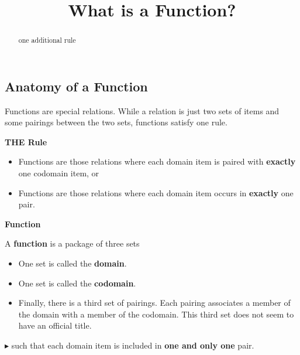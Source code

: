 \documentclass{ximera}
\title{What is a Function?}
\begin{document}
\begin{abstract}
one additional rule
\end{abstract}
\maketitle




\subsection*{Anatomy of a Function}

Functions are special relations. While a relation is just two sets of items and some pairings between the two sets, functions satisfy one rule. 


\begin{condition} \textbf{\textcolor{green!50!black}{THE Rule}} 

\begin{itemize}
\item Functions are those relations where each domain item is paired with \textbf{\textcolor{red!70!black}{exactly}} one codomain item, or
\item Functions are those relations where each domain item occurs in \textbf{\textcolor{red!70!black}{exactly}} one pair.
\end{itemize}
\end{condition}






\begin{definition} \textbf{\textcolor{green!50!black}{Function}}

A \textbf{function} is a package of three sets

\begin{itemize}
\item One set is called the \textbf{\textcolor{purple!85!blue}{domain}}. 
\item One set is called the \textbf{\textcolor{purple!85!blue}{codomain}}.  
\item Finally, there is a third set of pairings.  Each pairing associates a member of the domain with a member of the codomain. This third set does not seem to have an official title.
\end{itemize}

\textbf{\textcolor{red!70!darkgray}{$\blacktriangleright$}} such that each domain item is included in \textbf{\textcolor{red!70!black}{one and only one}} pair.

\end{definition}
\end{document}
